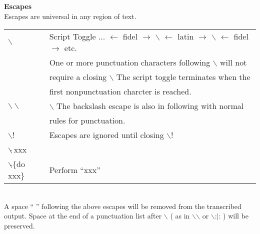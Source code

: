 \vspace{0.5in}
 
\noi
{\large\bf Escapes} \\

\noi
Escapes are universal in any region of text. \\
\noi
\begin{tabular}{|l|l|} \hline
  $\backslash$   &   Script Toggle ... $\leftarrow$ fidel $\rightarrow$ $\backslash$ $\leftarrow$ latin $\rightarrow$ $\backslash$ $\leftarrow$ fidel $\rightarrow$ etc. \\
                 &   One or more punctuation characters following $\backslash$ will not \\
                 &   require a closing $\backslash$  The script toggle terminates when the \\
                 &   first nonpunctuation charcter is reached. \\ \hline

  $\backslash\backslash$  &   $\backslash$ The backslash escape is also in following with normal \\
                &    rules for punctuation. \\ \hline

  $\backslash$! &   Escapes are ignored until closing $\backslash$!  \\ \hline

  $\backslash\tilde{}\,$xxx &  \\
  $\backslash\tilde{}$\{do xxx\}    &       Perform ``xxx''  \\ \hline
\end{tabular} \\

\noi
A space `` '' following the above escapes will be removed from the transcribed
output. Space at the end of a punctuation list after $\backslash$ ( as in $\backslash$$\backslash$ or $\backslash$:$|$: ) will
be preserved.

